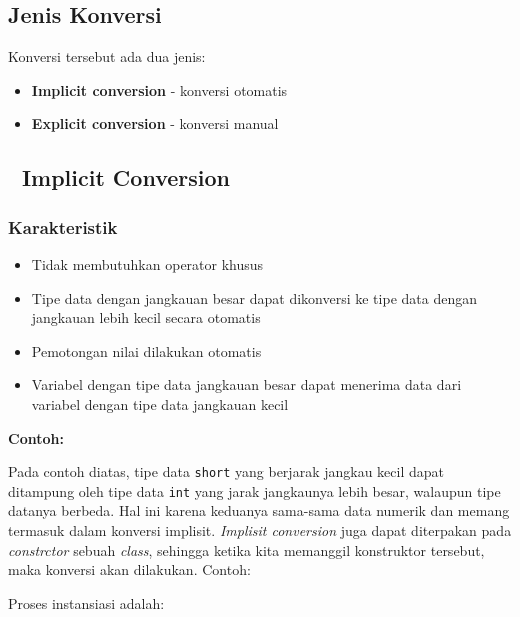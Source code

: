 \subsection{Jenis Konversi}

Konversi tersebut ada dua jenis:
\begin{itemize}
\item \textbf{Implicit conversion} - konversi otomatis
\item \textbf{Explicit conversion} - konversi manual
\end{itemize}

\subsection{🔄 Implicit Conversion}\label{implicit-conversion}

\subsubsection{Karakteristik}

\begin{itemize}
\item Tidak membutuhkan operator khusus
\item Tipe data dengan jangkauan besar dapat dikonversi ke tipe data dengan jangkauan lebih kecil secara otomatis
\item Pemotongan nilai dilakukan otomatis
\item Variabel dengan tipe data jangkauan besar dapat menerima data dari variabel dengan tipe data jangkauan kecil
\end{itemize}

\textbf{Contoh:}



Pada contoh diatas, tipe data \texttt{short} yang berjarak jangkau kecil
dapat ditampung oleh tipe data \texttt{int} yang jarak jangkaunya lebih
besar, walaupun tipe datanya berbeda. Hal ini karena keduanya sama-sama
data numerik dan memang termasuk dalam konversi implisit. \emph{Implisit
conversion} juga dapat diterpakan pada \emph{constrctor} sebuah
\emph{class}, sehingga ketika kita memanggil konstruktor tersebut, maka
konversi akan dilakukan. Contoh:



Proses instansiasi adalah:



